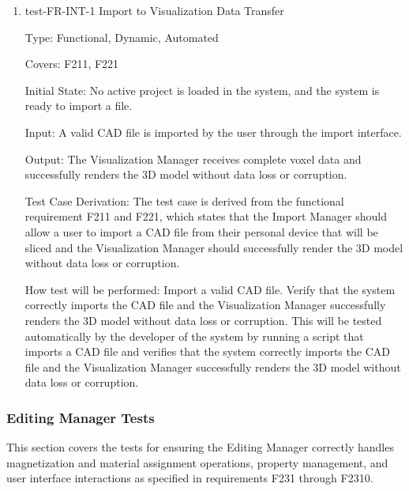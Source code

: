 \documentclass[12pt, titlepage]{article}
\begin{document}
\begin{enumerate}

\item{test-FR-INT-1 Import to Visualization Data Transfer\\}

Type: Functional, Dynamic, Automated

Covers: F211, F221
					
Initial State: No active project is loaded in the system, and the system is ready to import a file.
					
Input: A valid CAD file is imported by the user through the import interface.
					
Output: The Visualization Manager receives complete voxel data and successfully renders the 3D model without data loss or corruption.

Test Case Derivation: The test case is derived from the functional requirement F211 and F221, which states that the Import Manager should allow a user to import a CAD file from their personal device that will be sliced and the Visualization Manager should successfully render the 3D model without data loss or corruption.
					
How test will be performed: Import a valid CAD file. Verify that the system correctly imports the CAD file and the Visualization Manager successfully renders the 3D model without data loss or corruption. This will be tested automatically by the developer of the system by running a script that imports a CAD file and verifies that the system correctly imports the CAD file and the Visualization Manager successfully renders the 3D model without data loss or corruption.


\end{enumerate}

\subsubsection{Editing Manager Tests}
This section covers the tests for ensuring the Editing Manager correctly
handles magnetization and material assignment operations, property management,
and user interface interactions as specified in requirements F231 through F2310.
\end{document}
